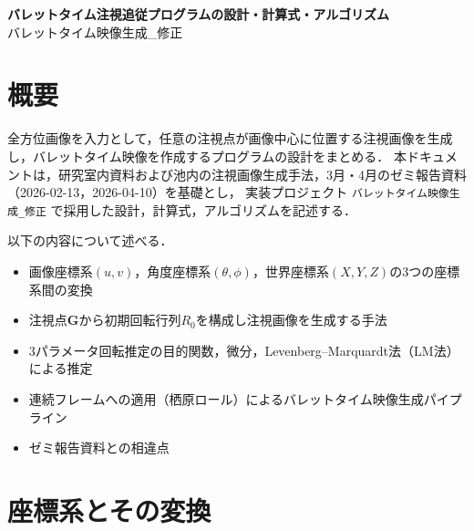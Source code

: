 \documentclass{ltjsarticle}          %
\begin{document}
\vspace*{2ex}
\begin{center}
  {\Large \bf バレットタイム注視追従プログラムの設計・計算式・アルゴリズム}\\[3mm]
  {\large バレットタイム映像生成\_修正}
\end{center}

\newcommand{\reffig}[1]{\hyperref[#1]{図\ref{#1}}}
\newcommand{\refeq}[1]{\hyperref[#1]{式(\ref{#1})}}
\newcommand{\reftab}[1]{\hyperref[#1]{表\ref{#1}}}
\newcommand{\refsec}[1]{\hyperref[#1]{\ref{#1}章}}
\newcommand{\refsubsec}[1]{\hyperref[#1]{\ref{#1}節}}

\section*{概要}
全方位画像を入力として，任意の注視点が画像中心に位置する注視画像を生成し，バレットタイム映像を作成するプログラムの設計をまとめる．
本ドキュメントは，研究室内資料\cite{bib_1}および池内\cite{bib_2}の注視画像生成手法，3月・4月のゼミ報告資料（2026-02-13，2026-04-10）を基礎とし，
実装プロジェクト \texttt{バレットタイム映像生成\_修正} で採用した設計，計算式，アルゴリズムを記述する．

以下の内容について述べる．
\begin{itemize}
  \item 画像座標系$(u,v)$，角度座標系$(\theta, \phi)$，世界座標系$(X,Y,Z)$の3つの座標系間の変換
  \item 注視点$\bm{G}$から初期回転行列$R_0$を構成し注視画像を生成する手法
  \item 3パラメータ回転推定の目的関数，微分，Levenberg--Marquardt法（LM法）による推定
  \item 連続フレームへの適用（栖原ロール）によるバレットタイム映像生成パイプライン
  \item ゼミ報告資料との相違点
\end{itemize}

\section{座標系とその変換}
\label{sec:coord}
\end{document}
